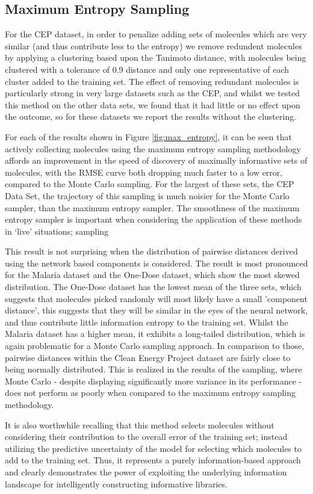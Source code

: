 \subsection{Maximum Entropy Sampling}

For the CEP dataset, in order to penalize adding sets of molecules which are very similar (and thus contribute less to the entropy) we remove redundent molecules by applying a clustering based upon the Tanimoto distance, with molecules being clustered with a tolerance of 0.9 distance and only one representative of each cluster added to the training set.  The effect of removing redundant molecules is particularly strong in very large datasets such as the CEP, and whilst we tested this method on the other data sets, we found that it had little or no effect upon the outcome, so for these datasets we report the results without the clustering.


For each of the results shown in Figure \ref{fig:max_entropy}, it can be seen that actively collecting molecules using the maximum entropy sampling methodology affords an improvement in the speed of discovery of maximally informative sets of molecules, with the RMSE curve both dropping much faster to a low error, compared to the Monte Carlo sampling.  For the largest of these sets, the CEP Data Set, the trajectory of this sampling is much noisier for the Monte Carlo sampler, than the maximum entropy sampler.  The smoothness of the maximum entropy sampler is important when considering the application of these methods in `live' situations; sampling 

This result is not surprising when the distribution of pairwise distances derived using the network based components is considered. The result is most pronounced for the Malaria dataset and the One-Dose dataset, which show the most skewed distribution.  The One-Dose dataset has the lowest mean of the three sets, which suggests that molecules picked randomly will most likely have a small 'component distance', this suggests that they will be similar in the eyes of the neural network, and thus contribute little information entropy to the training set. Whilst the Malaria dataset has a higher mean, it exhibits a long-tailed distribution, which is again problematic for a Monte Carlo sampling approach.  In comparison to those, pairwise distances within the Clean Energy Project dataset are fairly close to being normally distributed.  This is realized in the results of the sampling, where Monte Carlo - despite displaying significantly more variance in its performance - does not perform as poorly when compared to the maximum entropy sampling methodology.

It is also worthwhile recalling that this method selects molecules without considering their contribution to the overall error of the training set; instead utilizing the predictive uncertainty of the model for selecting which molecules to add to the training set. Thus, it represents a purely information-based approach and clearly demonstrates the power of exploiting the underlying information landscape for intelligently constructing informative libraries.